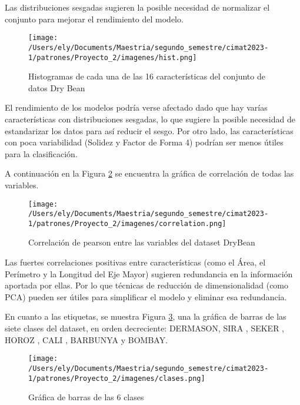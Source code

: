 \documentclass[letterpaper,spanish,reprint,nofootinbib,showkeys,aps]{revtex4-2}
\begin{document}
Las distribuciones sesgadas sugieren la posible necesidad de normalizar el conjunto para mejorar el rendimiento del modelo.

\begin{figure} [H]
	\begin{center}
		\texttt{[image: /Users/ely/Documents/Maestria/segundo\_semestre/cimat2023-1/patrones/Proyecto\_2/imagenes/hist.png]}
		\caption{Histogramas de cada una de las 16 características del conjunto de datos Dry Bean}
		\label{hist} 
   \end{center} 
\end{figure}


El rendimiento de los modelos podría verse afectado dado que hay varías características con distribuciones sesgadas, lo que sugiere la posible necesidad de estandarizar los datos para así reducir el sesgo. 
Por otro lado, las características con poca variabilidad (Solidez y Factor de Forma 4) podrían ser menos útiles para la clasificación.

A continuación en la Figura \ref{corr} se encuentra la gráfica de correlación de todas las variables. 

\begin{figure} [H]
	\begin{center}
		\texttt{[image: /Users/ely/Documents/Maestria/segundo\_semestre/cimat2023-1/patrones/Proyecto\_2/imagenes/correlation.png]}
		\caption{Correlación de pearson entre las variables del dataset DryBean}
		\label{corr} 
   \end{center} 
\end{figure}

Las fuertes correlaciones positivas entre características (como el Área, el Perímetro y la Longitud del Eje Mayor) sugieren redundancia en la información aportada por ellas. 
Por lo que técnicas de reducción de dimensionalidad (como PCA) pueden ser útiles para simplificar el modelo y eliminar esa redundancia.



En cuanto a las etiquetas, se muestra Figura \ref{clases}, una la gráfica de barras de las siete clases del dataset, en orden decreciente: 
DERMASON,   SIRA    ,   SEKER   ,   HOROZ   ,   CALI    ,   BARBUNYA y   BOMBAY. 



\begin{figure} [H]
	\begin{center}
		\texttt{[image: /Users/ely/Documents/Maestria/segundo\_semestre/cimat2023-1/patrones/Proyecto\_2/imagenes/clases.png]}
		\caption{Gráfica de barras de las 6 clases}
		\label{clases} 
   \end{center} 
\end{figure}
\end{document}
